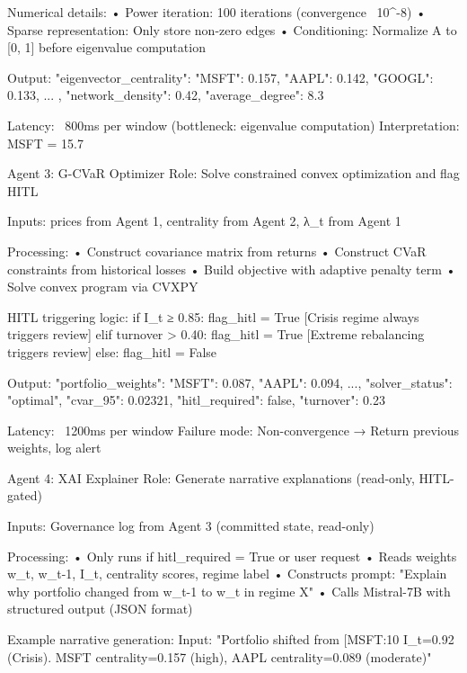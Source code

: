    Numerical details:
   • Power iteration: 100 iterations (convergence ~10^{-8})
   • Sparse representation: Only store non-zero edges
   • Conditioning: Normalize A to [0, 1] before eigenvalue computation
   
   Output:
   {
     "eigenvector_centrality": {
       "MSFT": 0.157,
       "AAPL": 0.142,
       "GOOGL": 0.133,
       ...
     },
     "network_density": 0.42,
     "average_degree": 8.3
   }
   
   Latency: ~800ms per window (bottleneck: eigenvalue computation)
   Interpretation: MSFT = 15.7%

Agent 3: G-CVaR Optimizer
   Role: Solve constrained convex optimization and flag HITL
   
   Inputs: prices from Agent 1, centrality from Agent 2, λ_t from Agent 1
   
   Processing:
   • Construct covariance matrix from returns
   • Construct CVaR constraints from historical losses
   • Build objective with adaptive penalty term
   • Solve convex program via CVXPY
   
   HITL triggering logic:
   if I_t ≥ 0.85:
     flag_hitl = True  [Crisis regime always triggers review]
   elif turnover > 0.40:
     flag_hitl = True  [Extreme rebalancing triggers review]
   else:
     flag_hitl = False
   
   Output:
   {
     "portfolio_weights": {"MSFT": 0.087, "AAPL": 0.094, ...},
     "solver_status": "optimal",
     "cvar_95": 0.02321,
     "hitl_required": false,
     "turnover": 0.23
   }
   
   Latency: ~1200ms per window
   Failure mode: Non-convergence → Return previous weights, log alert

Agent 4: XAI Explainer
   Role: Generate narrative explanations (read-only, HITL-gated)
   
   Inputs: Governance log from Agent 3 (committed state, read-only)
   
   Processing:
   • Only runs if hitl_required = True or user request
   • Reads weights w_t, w_{t-1}, I_t, centrality scores, regime label
   • Constructs prompt: "Explain why portfolio changed from w_{t-1} to w_t in regime X"
   • Calls Mistral-7B with structured output (JSON format)
   
   Example narrative generation:
   Input: "Portfolio shifted from [MSFT:10%
            I_t=0.92 (Crisis). MSFT centrality=0.157 (high), AAPL centrality=0.089 (moderate)"
   
